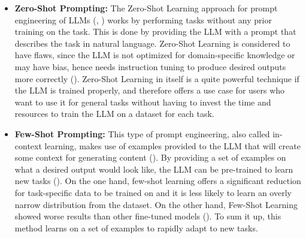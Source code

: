\documentclass[english,bachelor]{swsLeipzig}
\begin{document}
\begin{itemize}
  \item \textbf{Zero-Shot Prompting:} The Zero-Shot Learning approach for prompt engineering of LLMs (\citet{luo:2023}, \citet{wei:2021}) works by 
  performing tasks without any prior training on the task. This is done by providing the LLM with a prompt that describes the task in natural language. Zero-Shot Learning is considered to have flaws, since the LLM is not optimized for domain-specific knowledge or may have bias, hence needs instruction tuning to produce desired outputs more correctly (\citet{wei:2021}). Zero-Shot Learning in itself is a quite powerful technique if the LLM is trained properly, and therefore offers a use case for users who want to use it for general tasks without having to invest the time and resources to train the LLM on a dataset for each task.

  \item \textbf{Few-Shot Prompting:} This type of prompt engineering, also called in-context learning, makes use of 
  examples provided to the LLM that will create some context for generating content (\citet{brown:2020}). By providing a set of examples on what a desired output would look like, the LLM can be pre-trained to learn new tasks (\citet{touvron:2023}). On the one hand, few-shot learning offers a significant reduction for task-specific data to be trained on and it is less likely to learn an overly narrow distribution from the dataset. On the other hand, Few-Shot Learning showed worse results than other fine-tuned models (\citet{brown:2020}). To sum it up, this method learns on a set of examples to rapidly adapt to new tasks.


\end{itemize}
\end{document}
